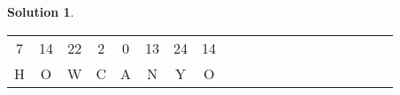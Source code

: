 \documentclass[11pt]{article}
\theoremstyle{definition}\newtheorem{definition}{Definition}
\theoremstyle{definition}\newtheorem{question}{Question}
\theoremstyle{definition}\newtheorem*{solution}{Solution}
\begin{document}
\begin{solution}
\begin{center}
\begin{tabular}{|cccccccccccccccccccc|}
                7     & 14    & 22    & 2                          & \multicolumn{1}{c|}{0}     & 13    & 24    & \multicolumn{1}{c|}{14}    &       &                            &       &                            &       &       &                            &                            &       &       &       &       \\ \cline{1-8}
                H     & O     & W     & C                          & \multicolumn{1}{c|}{A}     & N     & Y     & \multicolumn{1}{c|}{O}     &       &                            &       &                            &       &       &                            &                            &       &       &       &       \\ \hline
                \end{tabular}
        \end{center}


\end{solution}
\end{document}

